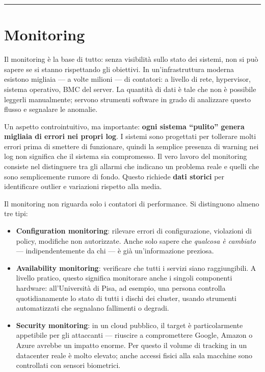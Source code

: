\documentclass[
  italian,
  openany]{book}
\providecommand{\tightlist}{%
  \setlength{\itemsep}{0pt}\setlength{\parskip}{0pt}}
\begin{document}
\begin{center}\rule{0.5\linewidth}{0.5pt}\end{center}

\section{Monitoring}\label{monitoring}

Il monitoring è la base di tutto: senza visibilità sullo stato dei
sistemi, non si può sapere se si stanno rispettando gli obiettivi. In
un'infrastruttura moderna esistono migliaia --- a volte milioni --- di
contatori: a livello di rete, hypervisor, sistema operativo, BMC del
server. La quantità di dati è tale che non è possibile leggerli
manualmente; servono strumenti software in grado di analizzare questo
flusso e segnalare le anomalie.

Un aspetto controintuitivo, ma importante: \textbf{ogni sistema
``pulito'' genera migliaia di errori nei propri log}. I sistemi sono
progettati per tollerare molti errori prima di smettere di funzionare,
quindi la semplice presenza di warning nei log non significa che il
sistema sia compromesso. Il vero lavoro del monitoring consiste nel
distinguere tra gli allarmi che indicano un problema reale e quelli che
sono semplicemente rumore di fondo. Questo richiede \textbf{dati
storici} per identificare outlier e variazioni rispetto alla media.

Il monitoring non riguarda solo i contatori di performance. Si
distinguono almeno tre tipi:

\begin{itemize}
\tightlist
\item
  \textbf{Configuration monitoring}: rilevare errori di configurazione,
  violazioni di policy, modifiche non autorizzate. Anche solo sapere che
  \emph{qualcosa è cambiato} --- indipendentemente da chi --- è già
  un'informazione preziosa.
\item
  \textbf{Availability monitoring}: verificare che tutti i servizi siano
  raggiungibili. A livello pratico, questo significa monitorare anche i
  singoli componenti hardware: all'Università di Pisa, ad esempio, una
  persona controlla quotidianamente lo stato di tutti i dischi dei
  cluster, usando strumenti automatizzati che segnalano fallimenti o
  degradi.
\item
  \textbf{Security monitoring}: in un cloud pubblico, il target è
  particolarmente appetibile per gli attaccanti --- riuscire a
  compromettere Google, Amazon o Azure avrebbe un impatto enorme. Per
  questo il volume di tracking in un datacenter reale è molto elevato;
  anche accessi fisici alla sala macchine sono controllati con sensori
  biometrici.
\end{itemize}
\end{document}
